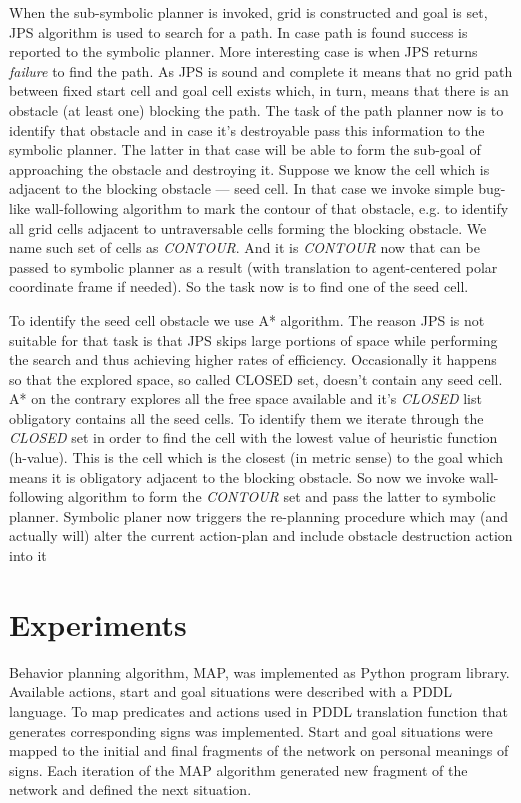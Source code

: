 \documentclass[procedia]{easychair}
\begin{document}
When the sub-symbolic planner is invoked, grid is constructed and goal is set, JPS algorithm is used to search for a path. In case path is found success is reported to the symbolic planner. More interesting case is when JPS returns \textit{failure} to find the path. As JPS is sound and complete it means that no grid path between fixed start cell and goal cell exists which, in turn, means that there is an obstacle (at least one) blocking the path. The task of the path planner now is to identify that obstacle and in case it's destroyable pass this information to the symbolic planner. The latter in that case will be able to form the sub-goal of approaching the obstacle and destroying it. Suppose we know the cell which is adjacent to the blocking obstacle --- seed cell. In that case we invoke simple bug-like wall-following algorithm to mark the contour of that obstacle, e.g. to identify all grid cells adjacent to untraversable cells forming the blocking obstacle. We name such set of cells as \textit{CONTOUR}. And it is \textit{CONTOUR} now that can be passed to symbolic planner as a result (with translation to agent-centered polar coordinate frame if needed). So the task now is to find one of the seed cell.

To identify the seed cell obstacle we use A* algorithm. The reason JPS is not suitable for that task is that JPS skips large portions of space while performing the search and thus achieving higher rates of efficiency. Occasionally it happens so that the explored space, so called CLOSED set, doesn't contain any seed cell. A* on the contrary explores all the free space available and it's \textit{CLOSED} list obligatory contains all the seed cells. To identify them we iterate through the \textit{CLOSED} set in order to find the cell with the lowest value of heuristic function (h-value). This is the cell which is the closest (in metric sense) to the goal which means it is obligatory adjacent to the blocking obstacle. So now we invoke wall-following algorithm to form the \textit{CONTOUR} set and pass the latter to symbolic planner. Symbolic planer now triggers the re-planning procedure which may (and actually will) alter the current action-plan and include obstacle destruction action into it

\section{Experiments}
\label{sect:experiments}
Behavior planning algorithm, MAP, was implemented as Python program library. Available actions, start and goal situations were described with a PDDL language. To map predicates and actions used in PDDL translation function that generates corresponding signs was implemented. Start and goal situations were mapped to the initial and final fragments of the network on personal meanings of signs. Each iteration of the MAP algorithm generated new fragment of the network and defined the next situation.
\end{document}
